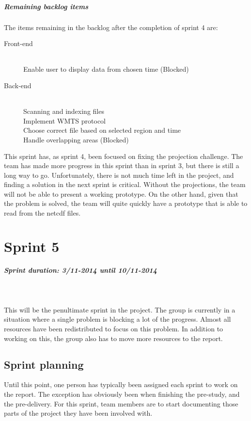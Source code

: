 \documentclass[11pt,a4paper,titlepage,oneside]{report}
\begin{document}
\paragraph{Remaining backlog items}
The items remaining in the backlog after the completion of sprint 4 are:

\begin{description}
	\item[Front-end] \hfill \\
	Enable user to display data from chosen time (Blocked)
	\item[Back-end] \hfill \\
	Scanning and indexing files \hfill \\
	Implement \gls{WMTS} \gls{protocol} \hfill \\
	Choose correct file based on selected region and time \hfill \\
	Handle overlapping areas (Blocked)
\end{description}
This sprint has, as sprint 4, been focused on fixing the projection challenge. The team has made more progress in this sprint than in sprint 3, but there is still a long way to go. Unfortunately, there is not much time left in the project, and finding a solution in the next sprint is critical. Without the projections, the team will not be able to present a working \gls{prototype}. On the other hand, given that the problem is solved, the team will quite quickly have a \gls{prototype} that is able to read from the \gls{netcdf} files. 

\chapter{Sprint 5}
\paragraph{Sprint duration: 3/11-2014 until 10/11-2014} \hfill \\
\\
\noindent
This will be the penultimate sprint in the project. The group is currently in a situation where a single problem is blocking a lot of the progress. Almost all resources have been redistributed to focus on this problem. In addition to working on this, the group also has to move more resources to the report. 

\section{Sprint planning}
Until this point, one person has typically been assigned each sprint to work on the report. The exception has obviously been when finishing the \gls{pre-study}, and the \gls{pre-delivery}. For this sprint, team members are to start documenting those parts of the project they have been involved with. 
\end{document}

